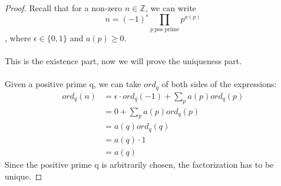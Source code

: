 \begin{proof}
Recall that for a non-zero $n \in \mathbb{Z}$, we can write
\[n = (-1)^{\epsilon} \prod_{p\ \text{pos prime}} p^{a(p)}\]
, where $\epsilon \in \{0, 1\}$ and $a(p) \geq 0$.\\\\
This is the existence part, now we will prove the uniqueness part.\\\\
Given a positive prime q, we can take $ord_q$ of both sides of the expressions:
\begin{align*}
    ord_q(n) &= \epsilon \cdot ord_q(-1) + \sum_p a(p) ord_q(p) \\
    &= 0 + \sum_p a(p) ord_q(p)\\
    &= a(q)ord_q(q) \tag*{$ord_q(p) = 0$ for all $p \neq q$}\\
    &= a(q) \cdot 1\\
    &= a(q)
\end{align*}
Since the positive prime q is arbitrarily chosen, the factorization has to be unique.
\end{proof}
